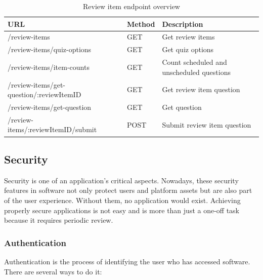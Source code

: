 \begin{table}[H]
    \begin{tabular}{|l|l|p{5.5cm}|}
        \hline
        \textbf{URL} & \textbf{Method} & \textbf{Description} \\
        \hline
        /review-items & GET & Get review items \\
        /review-items/quiz-options & GET & Get quiz options \\
        /review-items/item-counts & GET & Count scheduled and unscheduled questions \\
        /review-items/get-question/:reviewItemID & GET & Get review item question \\
        /review-items/get-question & GET & Get question \\
        /review-items/:reviewItemID/submit & POST & Submit review item question \\
        \hline
    \end{tabular}
    \caption{Review item endpoint overview}
    \label{tab:review-items-endpoints}
\end{table}

\subsection{Security}

Security is one of an application's critical aspects. Nowadays, these security features in software not only protect users and platform assets but are also part of the user experience. Without them, no application would exist. Achieving properly secure applications is not easy and is more than just a one-off task because it requires periodic review.

\subsubsection{Authentication}

Authentication is the process of identifying the user who has accessed software. There are several ways to do it:

